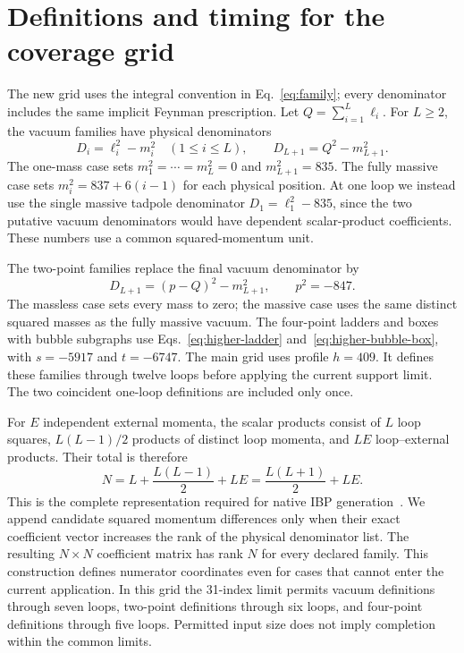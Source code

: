 \section{Definitions and timing for the coverage grid}
\label{app:coverage}
The new grid uses the integral convention in Eq.~\eqref{eq:family}; every denominator includes the same implicit Feynman prescription. Let $Q=\sum_{i=1}^{L}\ell_i$. For $L\geq2$, the vacuum families have physical denominators
\begin{equation}
D_i=\ell_i^2-m_i^2\quad(1\leq i\leq L),\qquad
D_{L+1}=Q^2-m_{L+1}^2.
\end{equation}
The one-mass case sets $m_1^2=\cdots=m_L^2=0$ and $m_{L+1}^2=835$. The fully massive case sets $m_i^2=837+6(i-1)$ for each physical position. At one loop we instead use the single massive tadpole denominator $D_1=\ell_1^2-835$, since the two putative vacuum denominators would have dependent scalar-product coefficients. These numbers use a common squared-momentum unit.

The two-point families replace the final vacuum denominator by
\begin{equation}
D_{L+1}=(p-Q)^2-m_{L+1}^2,\qquad p^2=-847.
\end{equation}
The massless case sets every mass to zero; the massive case uses the same distinct squared masses as the fully massive vacuum. The four-point ladders and boxes with bubble subgraphs use Eqs.~\eqref{eq:higher-ladder} and~\eqref{eq:higher-bubble-box}, with $s=-5917$ and $t=-6747$. The main grid uses profile $h=409$. It defines these families through twelve loops before applying the current support limit. The two coincident one-loop definitions are included only once.

For $E$ independent external momenta, the scalar products consist of $L$ loop squares, $L(L-1)/2$ products of distinct loop momenta, and $LE$ loop--external products. Their total is therefore
\begin{equation}
N=L+\frac{L(L-1)}2+LE=\frac{L(L+1)}2+LE.
\end{equation}
This is the complete representation required for native IBP generation~\cite{Kira3}. We append candidate squared momentum differences only when their exact coefficient vector increases the rank of the physical denominator list. The resulting $N\times N$ coefficient matrix has rank $N$ for every declared family. This construction defines numerator coordinates even for cases that cannot enter the current application. In this grid the 31-index limit permits vacuum definitions through seven loops, two-point definitions through six loops, and four-point definitions through five loops. Permitted input size does not imply completion within the common limits.


